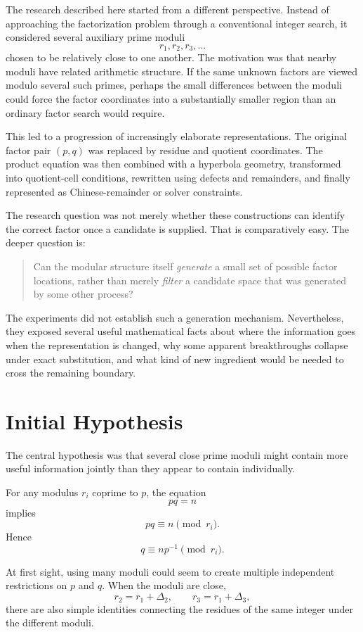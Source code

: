 \documentclass[11pt,a4paper]{article}
\begin{document}
The research described here started from a different perspective. Instead of approaching the factorization problem through a conventional integer search, it considered several auxiliary prime moduli
\[
    r_1,r_2,r_3,\ldots
\]
chosen to be relatively close to one another. The motivation was that nearby moduli have related arithmetic structure. If the same unknown factors are viewed modulo several such primes, perhaps the small differences between the moduli could force the factor coordinates into a substantially smaller region than an ordinary factor search would require.

This led to a progression of increasingly elaborate representations. The original factor pair $(p,q)$ was replaced by residue and quotient coordinates. The product equation was then combined with a hyperbola geometry, transformed into quotient-cell conditions, rewritten using defects and remainders, and finally represented as Chinese-remainder or solver constraints.

The research question was not merely whether these constructions can identify the correct factor once a candidate is supplied. That is comparatively easy. The deeper question is:

\begin{quote}
Can the modular structure itself \emph{generate} a small set of possible factor locations, rather than merely \emph{filter} a candidate space that was generated by some other process?
\end{quote}

The experiments did not establish such a generation mechanism. Nevertheless, they exposed several useful mathematical facts about where the information goes when the representation is changed, why some apparent breakthroughs collapse under exact substitution, and what kind of new ingredient would be needed to cross the remaining boundary.

\section{Initial Hypothesis}

The central hypothesis was that several close prime moduli might contain more useful information jointly than they appear to contain individually.

For any modulus $r_i$ coprime to $p$, the equation
\[
    pq=n
\]
implies
\[
    pq\equiv n\pmod{r_i}.
\]
Hence
\[
    q\equiv np^{-1}\pmod{r_i}.
\]

At first sight, using many moduli could seem to create multiple independent restrictions on $p$ and $q$. When the moduli are close,
\[
    r_2=r_1+\Delta_2,\qquad
    r_3=r_1+\Delta_3,
\]
there are also simple identities connecting the residues of the same integer under the different moduli.
\end{document}
